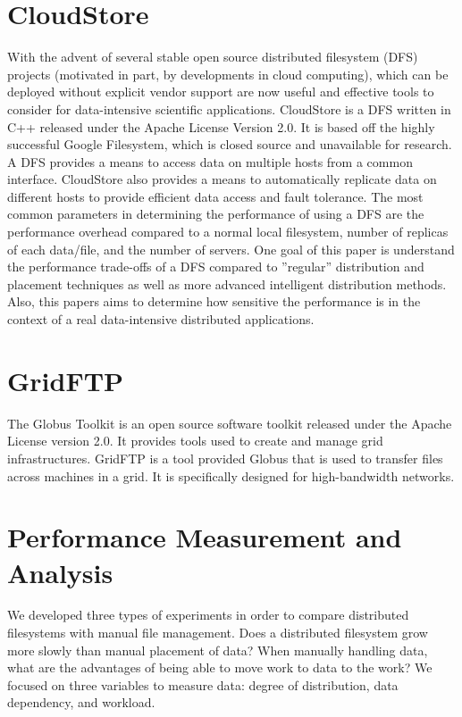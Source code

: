 \documentclass{rspublic}
\begin{document}
\section{CloudStore} With the advent of several stable open source distributed
filesystem (DFS) projects (motivated in part, by developments in cloud
computing), which can be deployed without explicit vendor support are now
useful and effective tools to consider for data-intensive scientific
applications.  CloudStore is a DFS written in C++ released under the Apache
License Version 2.0.  It is based off the highly successful Google Filesystem,
which is closed source and unavailable for research.  A DFS provides a means to
access data on multiple hosts from a common interface.  CloudStore also
provides a means to automatically replicate data on different hosts to provide
efficient data access and fault tolerance.  The most common parameters in
determining the performance of using a DFS are the performance overhead
compared to a normal local filesystem, number of replicas of each data/file,
and the number of servers.  One goal of this paper is understand the
performance trade-offs of a DFS compared to ''regular'' distribution and
placement techniques as well as more advanced intelligent distribution methods.
Also, this papers aims to determine how sensitive the performance is in the
context of a real data-intensive distributed applications.

\section{GridFTP} The Globus Toolkit is an open source software toolkit
released under the Apache License version 2.0.  It provides tools used to
create and manage grid infrastructures.  GridFTP is a tool provided Globus that
is used to transfer files across machines in a grid.  It is specifically
designed for high-bandwidth networks.

\section{Performance Measurement and Analysis} We developed three types of
experiments in order to compare distributed filesystems with manual file
management.  Does a distributed filesystem grow more slowly than manual
placement of data?  When manually handling data, what are the advantages of
being able to move work to data to the work?  We focused on three variables to
measure data:  degree of distribution, data dependency, and workload.
\end{document}
